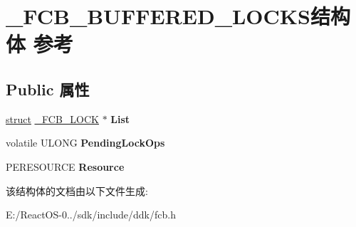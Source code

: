 \hypertarget{struct___f_c_b___b_u_f_f_e_r_e_d___l_o_c_k_s}{}\section{\+\_\+\+F\+C\+B\+\_\+\+B\+U\+F\+F\+E\+R\+E\+D\+\_\+\+L\+O\+C\+K\+S结构体 参考}
\label{struct___f_c_b___b_u_f_f_e_r_e_d___l_o_c_k_s}
\subsection*{Public 属性}
\begin{DoxyCompactItemize}
\item 
\mbox{\label{struct___f_c_b___b_u_f_f_e_r_e_d___l_o_c_k_s_a61a6e334ca2f1234aadcef8577ebd26a}} 
\hyperlink{interfacestruct}{struct} \hyperlink{struct___f_c_b___l_o_c_k}{\+\_\+\+F\+C\+B\+\_\+\+L\+O\+CK} $\ast$ {\bfseries List}
\item 
\mbox{\label{struct___f_c_b___b_u_f_f_e_r_e_d___l_o_c_k_s_aaad1a07ea66eb487df3db6585f83ab86}} 
volatile U\+L\+O\+NG {\bfseries Pending\+Lock\+Ops}
\item 
\mbox{\label{struct___f_c_b___b_u_f_f_e_r_e_d___l_o_c_k_s_ae13427ad6f7673b65d94ae6b0c89e90c}} 
P\+E\+R\+E\+S\+O\+U\+R\+CE {\bfseries Resource}
\end{DoxyCompactItemize}


该结构体的文档由以下文件生成\+:\begin{DoxyCompactItemize}
\item 
E\+:/\+React\+O\+S-\/0../sdk/include/ddk/fcb.\+h\end{DoxyCompactItemize}

